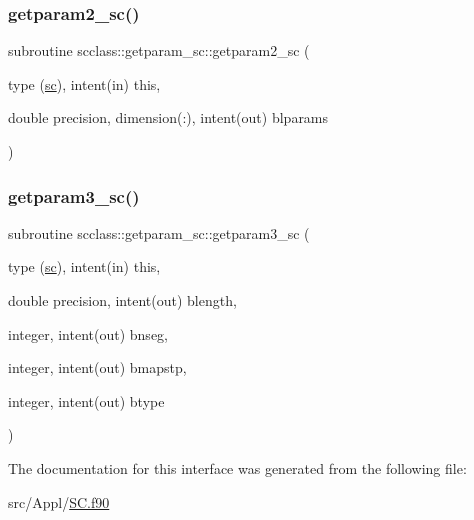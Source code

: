 \mbox{\label{interfacescclass_1_1getparam__sc_a55d64ae68903d972cfc2902370c300ff}} 
\subsubsection{\texorpdfstring{getparam2\_sc()}{getparam2\_sc()}}
{\footnotesize\ttfamily subroutine scclass\+::getparam\+\_\+sc\+::getparam2\+\_\+sc (\begin{DoxyParamCaption}\item[{type (\mbox{\hyperlink{namespacescclass_structscclass_1_1sc}{sc}}), intent(in)}]{this,  }\item[{double precision, dimension(\+:), intent(out)}]{blparams }\end{DoxyParamCaption})}

\mbox{\label{interfacescclass_1_1getparam__sc_afd39ed5e41024d90d1ccf3332951a9f1}} 
\subsubsection{\texorpdfstring{getparam3\_sc()}{getparam3\_sc()}}
{\footnotesize\ttfamily subroutine scclass\+::getparam\+\_\+sc\+::getparam3\+\_\+sc (\begin{DoxyParamCaption}\item[{type (\mbox{\hyperlink{namespacescclass_structscclass_1_1sc}{sc}}), intent(in)}]{this,  }\item[{double precision, intent(out)}]{blength,  }\item[{integer, intent(out)}]{bnseg,  }\item[{integer, intent(out)}]{bmapstp,  }\item[{integer, intent(out)}]{btype }\end{DoxyParamCaption})}



The documentation for this interface was generated from the following file\+:\begin{DoxyCompactItemize}
\item 
src/\+Appl/\mbox{\hyperlink{_s_c_8f90}{S\+C.\+f90}}\end{DoxyCompactItemize}

